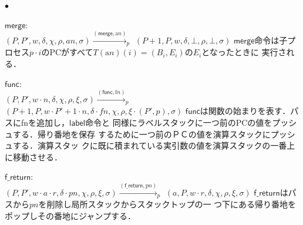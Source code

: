 \documentclass[submit,PRO]{ipsj}
\newcommand{\bcode}[1]{$\mathsf{#1}$}
\newcommand{\plabel}[1]{\mathrm{p}#1}
\newcommand{\flabel}[1]{\mathrm{f}#1}
\newcommand{\alabel}[1]{\mathrm{a}#1}
\begin{document}
\begin{list}{$\bullet$}{}
\item \bcode{merge}:\\
$(P,P',w,\delta,\chi,\rho,an,\sigma)\xrightarrow{(\mathsf{merge},\alabel{n})}_p$\newline
\qquad $(P+1,P,w,\delta,\bot,\rho,\bot,\sigma)$\newline
\bcode{merge}命令は子プロセス$p\cdot i$のPCがすべて$T(\alabel{n})(i)=(B_i,E_i)$の$E_i$となったときに
実行される．
\item \bcode{func}:\\
$(P,P',w\cdot n,\delta,\chi,\rho,\xi,\sigma)\xrightarrow{(\mathsf{func},\flabel{n})}_p$\newline
\qquad $(P+1,P,w\cdot P'+1\cdot n,\delta\cdot fn,\chi,\rho,\xi\cdot(P',p),\sigma)$\newline
\bcode{func}は関数の始まりを表す．パスにfnを追加し，\bcode{label}命令と
      同様にラベルスタックに一つ前のPCの値をプッシュする．帰り番地を保存
      するために一つ前のＰＣの値を演算スタックにプッシュする．演算スタッ
      クに既に積まれている実引数の値を演算スタックの一番上に移動させる．
\item \bcode{f\_return}:\\
$(P,P',w\cdot a\cdot r,\delta\cdot pn,\chi,\rho,\xi,\sigma)\xrightarrow{(\mathsf{f\_return},\plabel{n})}_p$\newline
\qquad $(a,P,w\cdot r,\delta,\chi,\rho,\xi,\sigma)$\newline
\bcode{f\_return}はパスから$pn$を削除し局所スタックからスタックトップの一
      つ下にある帰り番地をポップしその番地にジャンプする．

\end{list}
\end{document}
